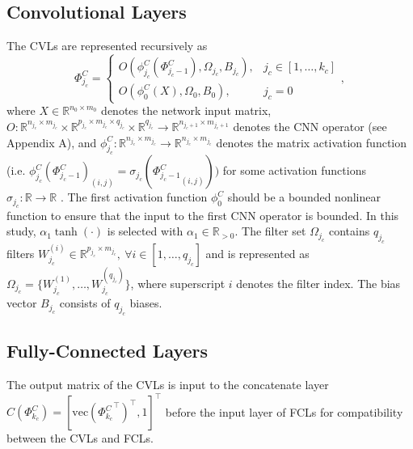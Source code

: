 \documentclass{l4dc2025}
\begin{document}
\subsection{Convolutional Layers}
The CVLs are represented recursively as
\begin{equation}
    \Phi^C_{j_c} = 
    \begin{cases}
        O(\phi^C_{j_c}(\Phi^C_{j_c-1}),\Omega_{j_c},B_{j_c}),&
        j_c\in[1,\dots,k_c]\\
        O(\phi^C_0(X),\Omega_0,B_0),&j_c=0
    \end{cases},
\end{equation}
where $X\in\mathbb{R}^{n_0\times m_0}$ denotes the network input matrix, $O:\mathbb{R}^{n_{{j_c}}\times {m_{j_c}}} \times \mathbb{R}^{p_{j_c}\times m_{j_c} \times q_{j_c} }\times \mathbb{R}^{q_{j_c}}\to \mathbb{R}^{n_{j_c+1}\times m_{j_c+1}}$ denotes the CNN operator (see Appendix A), and $\phi^C_{j_c}:  \mathbb{R}^{n_{j_c}\times m_{j_c}} \to  \mathbb{R}^{n_{j_c}\times m_{j_c}}$ denotes the matrix activation function (i.e. $ {\phi^C_{j_c}}(\Phi^C_{j_c-1})_{(i,j)}= \sigma_{j_c}({\Phi^C_{j_c-1}}_{(i,j)}))$ for some activation functions $\sigma_{j_c}:\mathbb{R}\to\mathbb{R}$ .
The first activation function $\phi^C_0$ should be a bounded nonlinear function to ensure that the input to the first CNN operator is bounded. In this study, $\alpha_1\tanh(\cdot)$ is selected with $\alpha_1\in\mathbb{R}_{>0}$.
The filter set $\Omega_{j_c}$ contains $q_{j_c}$ filters $W^{(i)}_{j_c}\in\mathbb{R}^{p_{j_c}\times m_{j_c}},\ \forall i\in[1,\dots, q_{j_c}]$ and is represented as $\Omega_{j_c} = \{W^{(1)}_{j_c},\dots,W^{(q_{j_c})}_{j_c}\}$, where superscript $i$ denotes the filter index. The bias vector $B_{j_c}$ consists of $q_{j_c}$ biases. 

\subsection{Fully-Connected Layers}

The output matrix of the CVLs is input to the concatenate layer $C(\Phi^C_{k_c}) = [\text{vec}({\Phi^C_{k_c}}^\top  )^\top,1]^\top$ before the input layer of FCLs for compatibility between the CVLs and FCLs.
\end{document}
